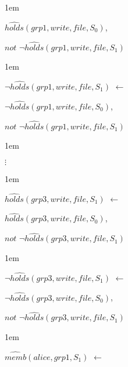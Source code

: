 \documentclass[global,twocolumn,final]{svjour}
\newenvironment{vquote}
  {\begin{list}{}{\leftmargin 1em}\item[]}
  {\end{list}}
\begin{document}
\begin{enumerate}
\begin{vquote}
           \hspace{1em}
           $\hat{holds}(grp1, write, file, S_{0})$,

           \hspace{1em}
           $not$ $\lnot\hat{holds}(grp1, write, file, S_{1})$
         \end{vquote}

         \begin{vquote}
           $\lnot\hat{holds}(grp1, write, file, S_{1})$ $\leftarrow$

           \hspace{1em}
           $\lnot\hat{holds}(grp1, write, file, S_{0})$,

           \hspace{1em}
           $not$ $\lnot\hat{holds}(grp1, write, file, S_{1})$
         \end{vquote}

         \begin{vquote}
           \hspace{2em}$\vdots$
         \end{vquote}

         \begin{vquote}
           $\hat{holds}(grp3, write, file, S_{1})$ $\leftarrow$

           \hspace{1em}
           $\hat{holds}(grp3, write, file, S_{0})$,

           \hspace{1em}
           $not$ $\lnot\hat{holds}(grp3, write, file, S_{1})$
         \end{vquote}

         \begin{vquote}
           $\lnot\hat{holds}(grp3, write, file, S_{1})$ $\leftarrow$

           \hspace{1em}
           $\lnot\hat{holds}(grp3, write, file, S_{0})$,

           \hspace{1em}
           $not$ $\lnot\hat{holds}(grp3, write, file, S_{1})$
         \end{vquote}

         \begin{vquote}
           $\hat{memb}(alice, grp1, S_{1})$ $\leftarrow$


\end{vquote}
\end{enumerate}
\end{document}
